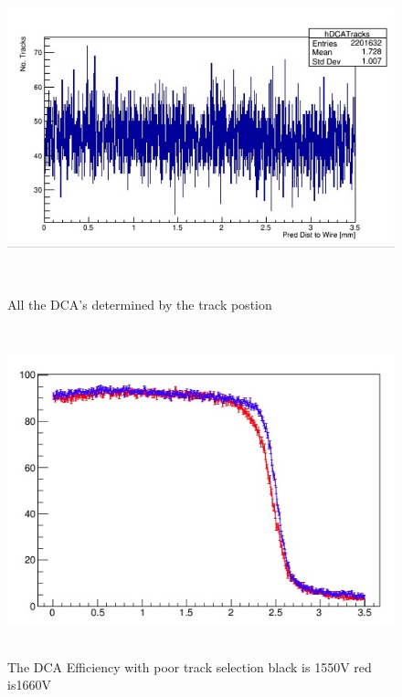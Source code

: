 \documentclass[./Thesis]{subfiles}
\begin{document}
\begin{figure}
	\centerline{\includegraphics[height=95mm]{DCATracks.jpeg}}
	\caption[DCA Tracks]{ All the DCA's determined by the track postion}
	\label{fig:dcaTracks}
\end{figure} 

\begin{figure}
	\centerline{\includegraphics[height=95mm]{BadDCAEff.jpeg}}
	\caption[BadDCAEfficiency]{ The DCA Efficiency with poor track selection black is 1550V red is1660V}
	\label{fig:badDCAeff}
\end{figure} 	
\end{document}
